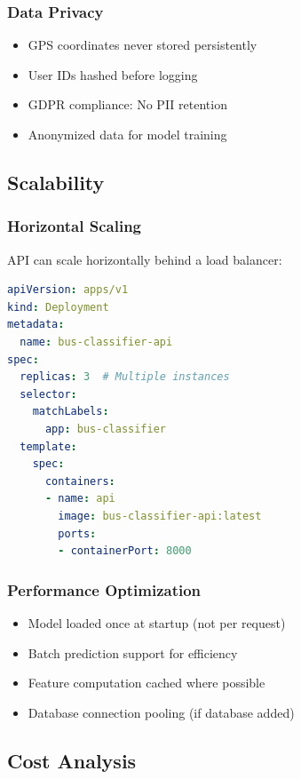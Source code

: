 \subsubsection{Data Privacy}

\begin{itemize}
    \item GPS coordinates never stored persistently
    \item User IDs hashed before logging
    \item GDPR compliance: No PII retention
    \item Anonymized data for model training
\end{itemize}

\subsection{Scalability}

\subsubsection{Horizontal Scaling}

API can scale horizontally behind a load balancer:

\begin{lstlisting}[language=yaml, caption=Kubernetes Deployment (example)]
apiVersion: apps/v1
kind: Deployment
metadata:
  name: bus-classifier-api
spec:
  replicas: 3  # Multiple instances
  selector:
    matchLabels:
      app: bus-classifier
  template:
    spec:
      containers:
      - name: api
        image: bus-classifier-api:latest
        ports:
        - containerPort: 8000
\end{lstlisting}

\subsubsection{Performance Optimization}

\begin{itemize}
    \item Model loaded once at startup (not per request)
    \item Batch prediction support for efficiency
    \item Feature computation cached where possible
    \item Database connection pooling (if database added)
\end{itemize}

\subsection{Cost Analysis}

